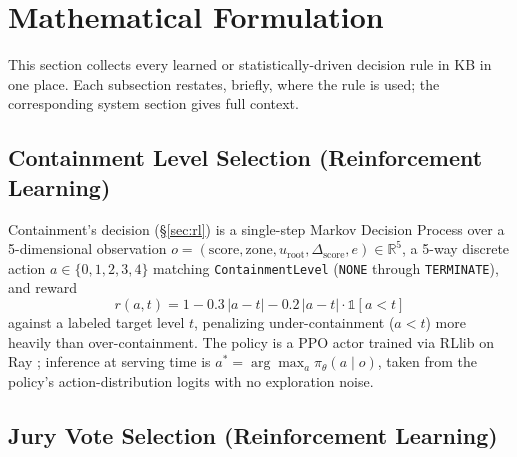 \documentclass{article}
\begin{document}
\section{Mathematical Formulation}
\label{sec:math}

This section collects every learned or statistically-driven decision
rule in KB in one place. Each subsection restates, briefly, where the
rule is used; the corresponding system section gives full context.

\subsection{Containment Level Selection (Reinforcement Learning)}
\label{sec:math-containment}

Containment's decision (\S\ref{sec:rl}) is a single-step Markov
Decision Process over a 5-dimensional observation
$o = (\mathrm{score}, \mathrm{zone}, u_{\mathrm{root}}, \Delta_{\mathrm{score}}, e) \in \mathbb{R}^5$,
a 5-way discrete action $a \in \{0,1,2,3,4\}$ matching
\texttt{ContainmentLevel} (\texttt{NONE} through \texttt{TERMINATE}),
and reward
\begin{equation}
  r(a, t) = 1 - 0.3\,|a-t| - 0.2\,|a-t|\cdot\mathbb{1}[a < t]
  \label{eq:containment-reward}
\end{equation}
against a labeled target level $t$, penalizing under-containment
($a<t$) more heavily than over-containment. The policy is a PPO
actor \citep{schulman2017proximal} trained via RLlib
\citep{liang2018rllib} on Ray \citep{moritz2018ray}; inference at
serving time is $a^\ast = \arg\max_a \pi_\theta(a \mid o)$, taken from
the policy's action-distribution logits with no exploration noise.

\subsection{Jury Vote Selection (Reinforcement Learning)}
\label{sec:math-jury}
\end{document}
